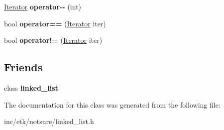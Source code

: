 \begin{DoxyCompactItemize}
\item 
\hypertarget{classetk_1_1linked__list_1_1_iterator_a9bbf5c4f03970b18889be617bb6b36fe}{\hyperlink{classetk_1_1linked__list_1_1_iterator}{Iterator} {\bfseries operator-\/-\/} (int)}\label{classetk_1_1linked__list_1_1_iterator_a9bbf5c4f03970b18889be617bb6b36fe}

\item 
\hypertarget{classetk_1_1linked__list_1_1_iterator_a072e2d67608993971b0dd62bb11f1eca}{bool {\bfseries operator==} (\hyperlink{classetk_1_1linked__list_1_1_iterator}{Iterator} iter)}\label{classetk_1_1linked__list_1_1_iterator_a072e2d67608993971b0dd62bb11f1eca}

\item 
\hypertarget{classetk_1_1linked__list_1_1_iterator_a155621c540dac84a1c8c9c6bcdd85b7e}{bool {\bfseries operator!=} (\hyperlink{classetk_1_1linked__list_1_1_iterator}{Iterator} iter)}\label{classetk_1_1linked__list_1_1_iterator_a155621c540dac84a1c8c9c6bcdd85b7e}

\end{DoxyCompactItemize}
\subsection*{Friends}
\begin{DoxyCompactItemize}
\item 
\hypertarget{classetk_1_1linked__list_1_1_iterator_a46e585d7fc977614d5e342b327ae08e5}{class {\bfseries linked\-\_\-list}}\label{classetk_1_1linked__list_1_1_iterator_a46e585d7fc977614d5e342b327ae08e5}

\end{DoxyCompactItemize}


The documentation for this class was generated from the following file\-:\begin{DoxyCompactItemize}
\item 
inc/etk/notsure/linked\-\_\-list.\-h\end{DoxyCompactItemize}
